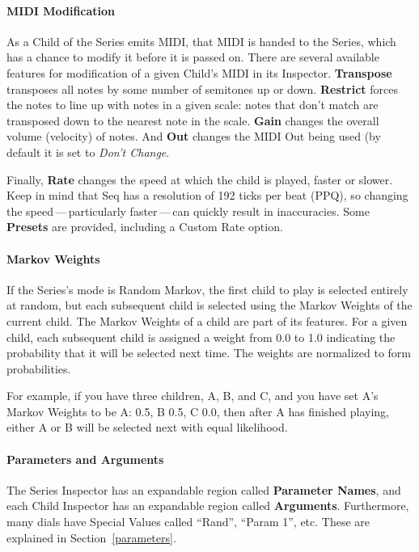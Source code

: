 \documentclass[twoside,10pt]{article}
\begin{document}
\paragraph{MIDI Modification}

As a Child of the Series emits MIDI, that MIDI is handed to the Series, which has a chance to modify it before it is passed on.  There are several available features for modification of a given Child's MIDI in its Inspector.  {\bf Transpose} transposes all notes by some number of semitones up or down.  {\bf Restrict} forces the notes to line up with notes in a given scale: notes that don't match are transposed down to the nearest note in the scale.  {\bf Gain} changes the overall volume (velocity) of notes.  And {\bf Out} changes the MIDI Out being used (by default it is set to {\it Don't Change}.

Finally, {\bf Rate} changes the speed at which the child is played, faster or slower.  Keep in mind that Seq has a resolution of 192 ticks per beat (PPQ), so changing the speed\,---\,particularly faster\,---\,can quickly result in inaccuracies.  Some {\bf Presets} are provided, including a Custom Rate option.

\paragraph{Markov Weights}

If the Series's mode is Random Markov, the first child to play is selected entirely at random, but each subsequent child is selected using the Markov Weights of the current child.  The Markov Weights of a child are part of its features.  For a given child, each subsequent child is assigned a weight from 0.0 to 1.0 indicating the probability that it will be selected next time.  The weights are normalized to form probabilities.

For example, if you have three children, A, B, and C, and you have set A's Markov Weights to be A: 0.5, B 0.5, C 0.0, then after A has finished playing, either A or B will be selected next with equal likelihood.

\paragraph{Parameters and Arguments}

The Series Inspector has an expandable region called {\bf Parameter Names}, and each Child Inspector has an expandable region called {\bf Arguments}. Furthermore, many dials have Special Values called ``Rand'', ``Param 1'', etc.  These are explained in Section~\ref{parameters}.
\end{document}
